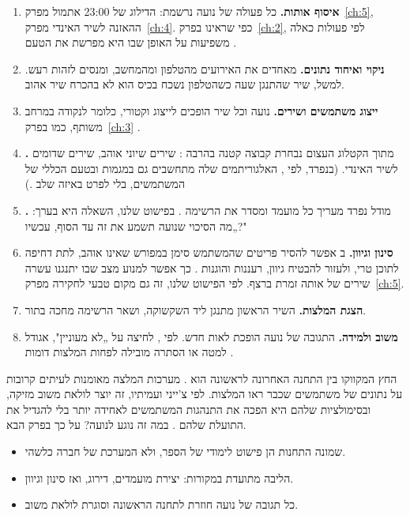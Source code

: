 \begin{enumerate}
  \item \textbf{איסוף אותות.} כל פעולה של נועה נרשמת: הדילוג של 23:00 אתמול מפרק~\ref{ch:5}, ההאזנה לשיר האינדי מפרק~\ref{ch:4}. כפי שראינו בפרק~\ref{ch:2}, לפי  פעולות כאלה משפיעות על האופן שבו היא מפרשת את הטעם \cite{spotify2026understanding}.
  \item \textbf{ניקוי ואיחוד נתונים.} מאחדים את האירועים מהטלפון ומהמחשב, ומנסים לזהות רעש. למשל, שיר שהתנגן שעה כשהטלפון נשכח בכיס הוא לא בהכרח שיר אהוב.
  \item \textbf{ייצוג משתמשים ושירים.} נועה וכל שיר הופכים לייצוג וקטורי, כלומר לנקודה במרחב משותף, כמו בפרק~\ref{ch:3} \cite{google2026candidate}.
  \item \textbf{.} מתוך הקטלוג העצום נבחרת קבוצה קטנה בהרבה \cite{google2026overview}: שירים שיוני אוהב, שירים שדומים לשיר האינדי. (בנפרד, לפי , האלגוריתמים שלה מתחשבים גם במגמות ובטעם הכללי של המשתמשים, בלי לפרט באיזה שלב \cite{spotify2026understanding}.)
  \item \textbf{.} מודל נפרד מעריך כל מועמד ומסדר את הרשימה \cite{covington2016deep}. בפישוט שלנו, השאלה היא בערך: „מה הסיכוי שנועה תשמע את זה עד הסוף, עכשיו?"
  \item \textbf{סינון וגיוון.} ב אפשר להסיר פריטים שהמשתמש סימן במפורש שאינו אוהב, לתת דחיפה לתוכן טרי, ולעזור להבטיח גיוון, רעננות והוגנות \cite{google2026overview}. כך אפשר למנוע מצב שבו יתנגנו עשרה שירים של אותה זמרת ברצף. לפי הפישוט שלנו, זה גם מקום טבעי לחקירה מפרק~\ref{ch:5}.
  \item \textbf{הצגת המלצות.} השיר הראשון מתנגן ליד השקשוקה, ושאר הרשימה מחכה בתור.
  \item \textbf{משוב ולמידה.} התגובה של נועה הופכת לאות חדש. לפי , לחיצה על „לא מעוניין", אגודל למטה או הסתרה מובילה לפחות המלצות דומות \cite{spotify2026understanding}.
\end{enumerate}

החץ המקווקו בין התחנה האחרונה לראשונה הוא . מערכות המלצה מאומנות לעיתים קרובות על נתונים של משתמשים שכבר ראו המלצות. לפי צ'ייני ועמיתיו, זה יוצר לולאת משוב מזיקה, ובסימולציות שלהם היא הפכה את התנהגות המשתמשים לאחידה יותר בלי להגדיל את התועלת שלהם \cite{chaney2018algorithmic}. במה זה נוגע לנועה? על כך בפרק הבא.

\begin{inshort}
\begin{itemize}
  \item שמונה התחנות הן פישוט לימודי של הספר, ולא המערכת של חברה כלשהי.
  \item הליבה מתועדת במקורות: יצירת מועמדים, דירוג, ואז סינון וגיוון.
  \item כל תגובה של נועה חוזרת לתחנה הראשונה וסוגרת לולאת משוב.
\end{itemize}
\end{inshort}

